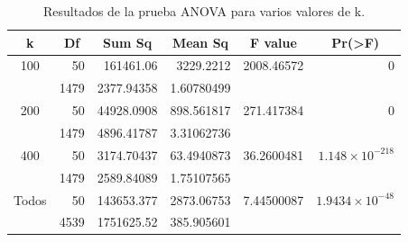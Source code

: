 \documentclass{article}
\begin{document}
\begin{table}[h!]
\centering
\caption{Resultados de la prueba ANOVA para varios valores de k.}
\label{tabla8}
\begin{tabular}{|c|r|r|r|r|r|}
\hline
k & \multicolumn{1}{c|}{\textbf{Df}} & \multicolumn{1}{c|}{\textbf{Sum Sq}} & \multicolumn{1}{c|}{\textbf{Mean Sq}} & \multicolumn{1}{c|}{\textbf{F value}} & \multicolumn{1}{c|}{\textbf{Pr(\textgreater{}F)}} \\ \hline
100 & 50 & 161461.06 & 3229.2212 & 2008.46572 & 0 \\ \hline
 & 1479 & 2377.94358 & 1.60780499 &  &  \\ \hline
200 & 50 & 44928.0908 & 898.561817 & 271.417384 & 0 \\ \hline
 & 1479 & 4896.41787 & 3.31062736 &  &  \\ \hline
400 & 50 & 3174.70437 & 63.4940873 & 36.2600481 & $1.148\times 10^{-218}$ \\ \hline
 & 1479 & 2589.84089 & 1.75107565 &  &  \\ \hline
Todos & 50 & 143653.377 & 2873.06753 & 7.44500087 & $1.9434\times 10^{-48}$ \\ \hline
 & 4539 & 1751625.52 & 385.905601 &  &  \\ \hline
\end{tabular}
\end{table}

\newpage
\end{document}
